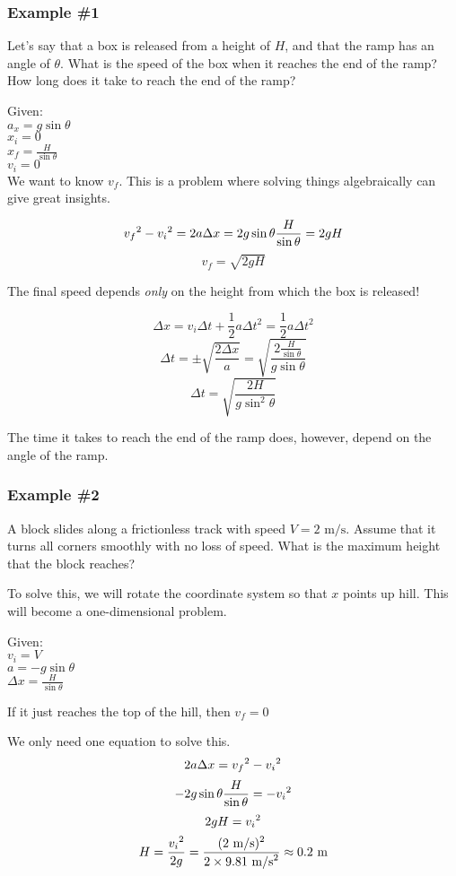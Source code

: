\subsubsection{Example \#1}
Let's say that a box is released from a height of $H$, and that the ramp has an angle of $\theta$. What is the speed of the box when it reaches the end of the ramp? How long does it take to reach the end of the ramp?

Given:\\
$a_x=g\sin\theta$\\
$x_i=0$\\
$x_f=\frac{H}{\sin\theta}$\\
$v_i=0$\\

We want to know $v_f$. This is a problem where solving things algebraically can give great insights.

$$v_f\displaystyle^2-v_i\displaystyle^2=2a\Delta{x}=2g\sin\theta\frac{H}{\sin\theta}=2gH$$
$$\boxed{v_f=\sqrt{2gH}}$$

The final speed depends \textit{only} on the height from which the box is released!

$$\Delta{x}=v_i\Delta{t}+\frac{1}{2}a\Delta{t}^2=\frac{1}{2}a\Delta{t}^2$$
$$\Delta{t}=\pm\sqrt{\frac{2\Delta{x}}{a}}=\sqrt{\frac{2\frac{H}{\sin\theta}}{g\sin\theta}}$$
$$\boxed{\Delta{t}=\sqrt{\frac{2H}{g\sin^2\theta}}}$$

The time it takes to reach the end of the ramp does, however, depend on the angle of the ramp. 

\subsubsection{Example \#2}
A block slides along a frictionless track with speed $V=2\mbox{ m/s}$. Assume that it turns all corners smoothly with no loss of speed. What is the maximum height that the block reaches?
\vspace{5cm}

To solve this, we will rotate the coordinate system so that $x$ points up hill. This will become a one-dimensional problem.

Given:\\
$v_i=V$\\
$a=-g\sin\theta$\\
$\Delta{x}=\frac{H}{\sin\theta}$

If it just reaches the top of the hill, then $v_f=0$

We only need one equation to solve this.
$$2a\Delta{x}=v_f\displaystyle^2-v_i\displaystyle^2$$
$$-2g\sin\theta\frac{H}{\sin\theta}=-v_i\displaystyle^2$$
$$2gH=v_i\displaystyle^2$$
$$H=\frac{v_i\displaystyle^2}{2g}=\frac{(2\mbox{ m/s})\displaystyle^2}{2\times 9.81\mbox{ m/s}\displaystyle^2}\approx 0.2\mbox{ m}$$


